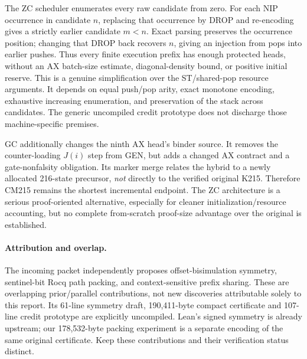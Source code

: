 \documentclass[11pt]{article}
\begin{document}
The ZC scheduler enumerates every raw candidate from zero. For each NIP occurrence in candidate $n$, replacing that occurrence by DROP and re-encoding gives a strictly earlier candidate $m<n$. Exact parsing preserves the occurrence position; changing that DROP back recovers $n$, giving an injection from pops into earlier pushes. Thus every finite execution prefix has enough protected heads, without an AX batch-size estimate, diagonal-density bound, or positive initial reserve. This is a genuine simplification over the ST/shared-pop resource arguments. It depends on equal push/pop arity, exact monotone encoding, exhaustive increasing enumeration, and preservation of the stack across candidates. The generic uncompiled credit prototype does not discharge those machine-specific premises.

GC additionally changes the ninth AX head's binder source. It removes the counter-loading $J(i)$ step from GEN, but adds a changed AX contract and a gate-nonfalsity obligation. Its marker merge relates the hybrid to a newly allocated 216-state precursor, \emph{not} directly to the verified original K215. Therefore CM215 remains the shortest incremental endpoint. The ZC architecture is a serious proof-oriented alternative, especially for cleaner initialization/resource accounting, but no complete from-scratch proof-size advantage over the original is established.

\paragraph{Attribution and overlap.}
The incoming packet independently proposes offset-bisimulation symmetry, sentinel-bit Rocq path packing, and context-sensitive prefix sharing. These are overlapping prior/parallel contributions, not new discoveries attributable solely to this report. Its 61-line symmetry draft, 190,411-byte compact certificate and 107-line credit prototype are explicitly uncompiled. Lean's signed symmetry is already upstream; our 178,532-byte packing experiment is a separate encoding of the same original certificate. Keep these contributions and their verification status distinct.
\end{document}
